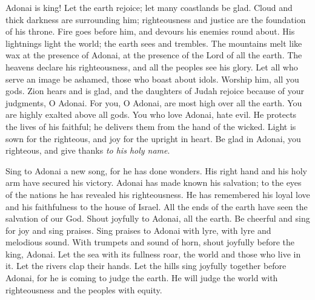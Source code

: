 \begin{biblechapter} %
 Adonai is king! Let the earth rejoice; 
let many coastlands be glad.
\verse Cloud and thick darkness are surrounding him; 
righteousness and justice are the foundation of his throne.
\verse Fire goes before him, 
and devours his enemies round about.
\verse His lightnings light the world; 
the earth sees and trembles.
\verse The mountains melt like wax at the presence of Adonai, 
at the presence of the Lord of all the earth.
\verse The heavens declare his righteousness, 
and all the peoples see his glory.
\verse Let all who serve an image be ashamed, 
those who boast about idols. 
Worship him, all you gods.
\verse Zion hears and is glad, 
and the daughters of Judah rejoice 
because of your judgments, O Adonai.
\verse For you, O Adonai, are most high over all the earth. 
You are highly exalted above all gods.
\verse You who love Adonai, hate evil. 
He protects the lives of his faithful; 
he delivers them from the hand of the wicked.
\verse Light is sown for the righteous, 
and joy for the upright in heart.
\verse Be glad in Adonai, you righteous, 
and give thanks \textit{to his holy name}.
\end{biblechapter}

\begin{biblechapter} %
 Sing to Adonai a new song, for he has done wonders. 
His right hand and his holy arm have secured his victory.
\verse Adonai has made known his salvation; 
to the eyes of the nations he has revealed his righteousness.
\verse He has remembered his loyal love and his faithfulness 
to the house of Israel. 
All the ends of the earth have seen 
the salvation of our God.
\verse Shout joyfully to Adonai, all the earth. 
Be cheerful and sing for joy and sing praises.
\verse Sing praises to Adonai with lyre, 
with lyre and melodious sound.
\verse With trumpets and sound of horn, 
shout joyfully before the king, Adonai.
\verse Let the sea with its fullness roar, 
the world and those who live in it.
\verse Let the rivers clap their hands. 
Let the hills sing joyfully together
\verse before Adonai, for he is coming 
to judge the earth. 
He will judge the world with righteousness 
and the peoples with equity.
\end{biblechapter}


